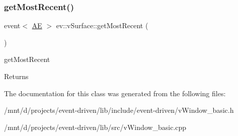 \subsubsection{\texorpdfstring{get\+Most\+Recent()}{getMostRecent()}}
{\footnotesize\ttfamily event$<$ \hyperlink{classev_1_1AddressEvent}{AE} $>$ ev\+::v\+Surface\+::get\+Most\+Recent (\begin{DoxyParamCaption}{ }\end{DoxyParamCaption})}



get\+Most\+Recent 

\begin{DoxyReturn}{Returns}

\end{DoxyReturn}


The documentation for this class was generated from the following files\+:\begin{DoxyCompactItemize}
\item 
/mnt/d/projects/event-\/driven/lib/include/event-\/driven/v\+Window\+\_\+basic.\+h\item 
/mnt/d/projects/event-\/driven/lib/src/v\+Window\+\_\+basic.\+cpp\end{DoxyCompactItemize}
